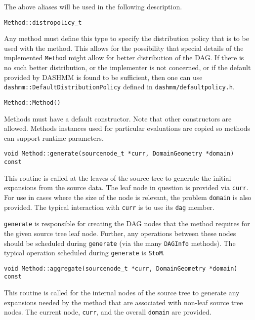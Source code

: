 \noindent The above aliases will be used in the following description.

\begin{lstlisting}
Method::distropolicy_t
\end{lstlisting}

\noindent
Any method must define this type to specify the distribution policy that is to
be used with the method. This allows for the possibility that special details
of the implemented \texttt{Method} might allow for better distribution of the
DAG. If there is no such better distribution, or the implementer is not
concerned, or if the default provided by DASHMM is found to be sufficient, then
one can use \texttt{dashmm::DefaultDistributionPolicy} defined in
\texttt{dashmm/defaultpolicy.h}.

\begin{lstlisting}
Method::Method()
\end{lstlisting}

\noindent
Methods must have a default constructor. Note that other constructors are
allowed. Methods instances used for particular evaluations are copied so
methods can support runtime parameters.

\begin{lstlisting}
void Method::generate(sourcenode_t *curr, DomainGeometry *domain) const
\end{lstlisting}

\noindent
This routine is called at the leaves of the source tree to generate the initial
expansions from the source data. The leaf node in question is provided via
\texttt{curr}. For use in cases where the size of the node is relevant,
the problem \texttt{domain} is also provided. The typical interaction with
\texttt{curr} is to use its \texttt{dag} member.

\texttt{generate} is responsible for creating the DAG nodes that the method
requires for the given source tree leaf node. Further, any operations between
these nodes should be scheduled during \texttt{generate} (via the many
\texttt{DAGInfo} methods). The typical operation scheduled during
\texttt{generate} is \texttt{StoM}.


\begin{lstlisting}
void Method::aggregate(sourcenode_t *curr, DomainGeometry *domain) const
\end{lstlisting}

\noindent
This routine is called for the internal nodes of the source tree to generate
any expansions needed by the method that are associated with non-leaf source
tree nodes. The current node, \texttt{curr}, and the overall \texttt{domain}
are provided.

